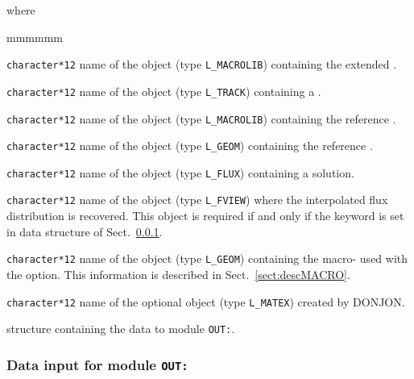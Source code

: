 \noindent where
\begin{ListeDeDescription}{mmmmmm}

\item[\dusa{MACRO2}] {\tt character*12} name of the  object (type {\tt L\_MACROLIB}) containing the extended .

\item[\dusa{TRACK}] {\tt character*12} name of the  object (type {\tt L\_TRACK}) containing a .

\item[\dusa{MACRO}] {\tt character*12} name of the  object (type {\tt L\_MACROLIB}) containing the reference .

\item[\dusa{REFGEO}] {\tt character*12} name of the  object (type {\tt L\_GEOM}) containing the reference .

\item[\dusa{FLUX}] {\tt character*12} name of the  object (type {\tt L\_FLUX}) containing a solution.

\item[\dusa{IFLU}] {\tt character*12} name of the  object (type {\tt L\_FVIEW}) where the
interpolated flux distribution is recovered. This  object is required if and only if the keyword 
is set in data structure  of Sect.~\ref{sect:out_data}.

\item[\dusa{MACGEO}] {\tt character*12} name of the  object (type {\tt L\_GEOM}) containing the macro- used
with the   option. This information is described in Sect.~\ref{sect:descMACRO}.

\item[\dusa{MATEX}] {\tt character*12} name of the optional  object (type {\tt L\_MATEX}) created by DONJON.

\item[\dstr{out\_data}] structure containing the data to module {\tt OUT:}\label{sect:out_data}.

\end{ListeDeDescription}

\vskip 0.2cm

\subsubsection{Data input for module {\tt OUT:}}\label{sect:out_data}

